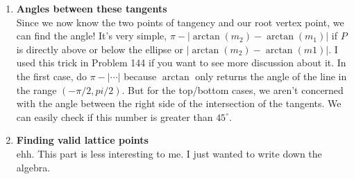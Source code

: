 \documentclass[11pt, oneside]{article}
\begin{document}
\begin{enumerate}
	\item \textbf{Angles between these tangents}\\
		Since we now know the two points of tangency and our root vertex point, we can find the angle! It's very simple, 
		$\pi - |\arctan(m_2)-\arctan(m_1)|$ if $P$ is directly above or below the ellipse or $|\arctan(m_2)-\arctan(m1)|$. I used this trick in Problem 
		144 if you want to see more discussion about it. In the first case, do $\pi-|\cdots|$ because $\arctan$ only returns the angle of the line in the
		range $(-\pi / 2, pi/2)$. But for the top/bottom cases, we aren't concerned with the angle between the right side of the intersection of the 
		tangents. We can easily check if this number is greater than $45^{\circ}$.

	\item \textbf{Finding valid lattice points}\\
		ehh. This part is less interesting to me. I just wanted to write down the algebra.
\end{enumerate}
\end{document}
